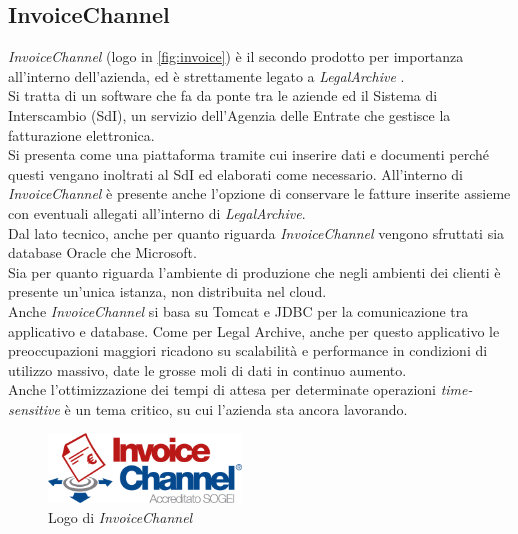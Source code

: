 \subsection{InvoiceChannel}
\textit{InvoiceChannel} (logo in \autoref{fig:invoice}) è il secondo prodotto per importanza all'interno dell'azienda, ed è strettamente legato a \textit{LegalArchive} \cite{site:invoicechannel}.\\
Si tratta di un software che fa da ponte tra le aziende ed il Sistema di Interscambio (SdI), un servizio dell'Agenzia delle Entrate che gestisce la fatturazione elettronica.\\
Si presenta come una piattaforma tramite cui inserire dati e documenti perché questi vengano inoltrati al SdI ed elaborati come necessario. All'interno di \textit{InvoiceChannel} è presente anche l'opzione di conservare le fatture inserite assieme con eventuali allegati all'interno di \textit{LegalArchive}.\\
Dal lato tecnico, anche per quanto riguarda \textit{InvoiceChannel} vengono sfruttati sia database Oracle che Microsoft.\\
Sia per quanto riguarda l'ambiente di produzione che negli ambienti dei clienti è presente un'unica istanza, non distribuita nel cloud.\\
Anche \textit{InvoiceChannel} si basa su \gls{Tomcat} e \gls{JDBC} per la comunicazione tra applicativo e database.
Come per Legal Archive, anche per questo applicativo le preoccupazioni maggiori ricadono su scalabilità e performance in condizioni di utilizzo massivo, date le grosse moli di dati in continuo aumento.\\
Anche l'ottimizzazione dei tempi di attesa per determinate operazioni \textit{time-sensitive} è un tema critico, su cui l'azienda sta ancora lavorando.\\

\begin{figure}[htbp]
\begin{center}
\includegraphics[height=5em]{immagini/tecnologies-logos/logo-invoice-channel.png}
\caption{Logo di \textit{InvoiceChannel}}
\label{fig:invoice}
\end{center}
\end{figure}

